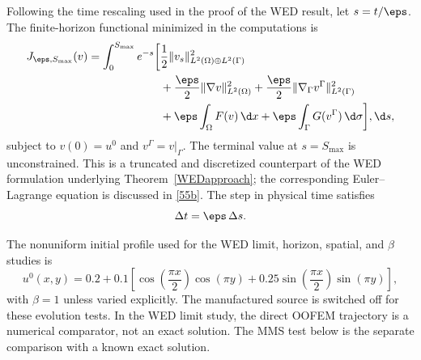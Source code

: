 Following the time rescaling used in the proof of the WED result, let $s=t/\eps$. The finite-horizon functional minimized in the computations is
\begin{equation}
\label{num:wed}
\begin{split}
J_{\eps,S_{\max}}(v)=\int_0^{S_{\max}}e^{-s}\bigg[&\frac12\|v_s\|^2_{L^2(\Omega)\oplus L^2(\Gamma)}\\
&+\frac{\eps}{2}\|\nabla v\|^2_{L^2(\Omega)}
+\frac{\eps}{2}\|\nabla_\Gamma v^\Gamma\|^2_{L^2(\Gamma)}\\
&+\eps\int_\Omega F(v)\,\d x
+\eps\int_\Gamma G(v^\Gamma)\,\d\sigma\bigg],\d s,
\end{split}
\end{equation}
subject to $v(0)=u^0$ and $v^\Gamma=v|_\Gamma$. The terminal value at $s=S_{\max}$ is unconstrained. This is a truncated and discretized counterpart of the WED formulation underlying Theorem~\ref{WEDapproach}; the corresponding Euler--Lagrange equation is discussed in \eqref{55b}. The step in physical time satisfies
\begin{equation}
\label{num:dt}
\Delta t=\eps\,\Delta s.
\end{equation}

The nonuniform initial profile used for the WED limit, horizon, spatial, and $\beta$ studies is
\begin{equation}
\label{num:initial}
u^0(x,y)=0.2+0.1\left[\cos\!\left(\frac{\pi x}{2}\right)\cos(\pi y)
+0.25\sin\!\left(\frac{\pi x}{2}\right)\sin(\pi y)\right],
\end{equation}
with $\beta=1$ unless varied explicitly. The manufactured source is switched off for these evolution tests. In the WED limit study, the direct OOFEM trajectory is a numerical comparator, not an exact solution. The MMS test below is the separate comparison with a known exact solution.

